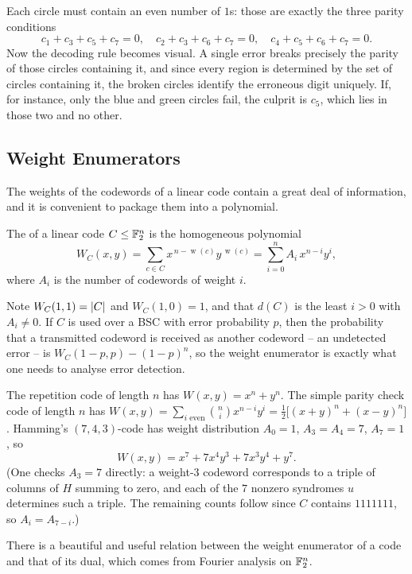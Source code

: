 \documentclass[a4paper]{scrartcl}
\DeclareMathOperator{\wt}{w}
\begin{document}
Each circle must contain an even number of $1$s: those are exactly the three parity conditions
$$c_1+c_3+c_5+c_7 = 0,\quad c_2+c_3+c_6+c_7=0,\quad c_4+c_5+c_6+c_7=0.$$
Now the decoding rule becomes visual. A single error breaks precisely the parity of those circles containing it, and since every region is determined by the set of circles containing it, the broken circles identify the erroneous digit uniquely. If, for instance, only the blue and green circles fail, the culprit is $c_5$, which lies in those two and no other.

\subsection{Weight Enumerators}

The weights of the codewords of a linear code contain a great deal of information, and it is convenient to package them into a polynomial.

\begin{definition}
	The  of a linear code $C \le \mathbb{F}_2^n$ is the homogeneous polynomial
	$$W_C(x,y) = \sum_{c \in C} x^{\,n-\wt(c)}y^{\,\wt(c)} = \sum_{i=0}^n A_i\, x^{n-i}y^i,$$
	where $A_i$ is the number of codewords of weight $i$.
\end{definition}

Note $W_C(1,1) = \lvert C\rvert$ and $W_C(1,0) = 1$, and that $d(C)$ is the least $i>0$ with $A_i \ne 0$. If $C$ is used over a BSC with error probability $p$, then the probability that a transmitted codeword is received as another codeword -- an undetected error -- is $W_C(1-p,p) - (1-p)^n$, so the weight enumerator is exactly what one needs to analyse error detection.

\begin{example}
	The repetition code of length $n$ has $W(x,y) = x^n + y^n$. The simple parity check code of length $n$ has $W(x,y) = \sum_{i \text{ even}}\binom ni x^{n-i}y^i = \tfrac12\bigl[(x+y)^n + (x-y)^n\bigr]$. Hamming's $(7,4,3)$-code has weight distribution $A_0 = 1$, $A_3 = A_4 = 7$, $A_7 = 1$, so
	$$W(x,y) = x^7 + 7x^4y^3+7x^3y^4+y^7.$$
	(One checks $A_3 = 7$ directly: a weight-$3$ codeword corresponds to a triple of columns of $H$ summing to zero, and each of the $7$ nonzero syndromes $u$ determines such a triple. The remaining counts follow since $C$ contains $1111111$, so $A_i = A_{7-i}$.)
\end{example}

There is a beautiful and useful relation between the weight enumerator of a code and that of its dual, which comes from Fourier analysis on $\mathbb{F}_2^n$.
\end{document}
